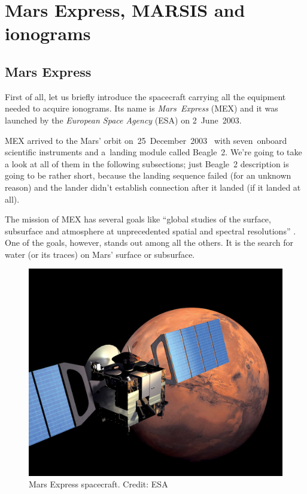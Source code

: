 \chapter{Mars Express, MARSIS and ionograms}

\section{Mars Express}
First of all, let us briefly introduce the spacecraft carrying all the equipment needed to acquire ionograms. Its name is \textit{Mars~Express} (MEX) and it was launched by the \textit{European Space Agency} (ESA) on 2~June~2003.

MEX arrived to the Mars' orbit on~25~December~2003~\citep{Chicarro2004} with seven~onboard scientific instruments and a~landing module called Beagle~2. We're going to take a look at all of them in the following subsections; just Beagle~2 description is going to be rather short, because the landing sequence failed (for an unknown reason) and the lander didn't establish connection after it landed (if it landed at all)\citep[p.~4]{Chicarro2004}. 

The mission of MEX has several goals like ``global studies of the surface, subsurface and atmosphere at unprecedented spatial and spectral resolutions'' \citep[p.~viii]{Chicarro2004}. One of the goals, however, stands out among all the others. It is the search for water (or its traces) on Mars' surface or subsurface.

\begin{figure}
	\centering
	\includegraphics[width=140mm]{images/Mars.jpg}
	\caption{Mars Express spacecraft. Credit: ESA \citep{ESA2010}}
	\label{fig:mex}
\end{figure}

